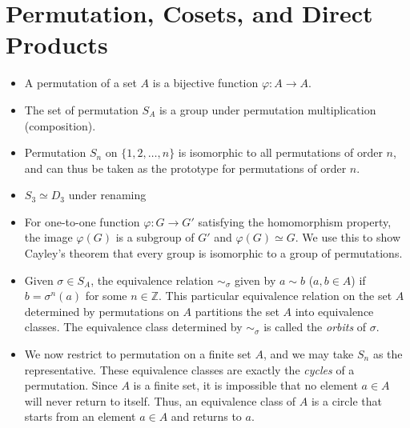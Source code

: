 \documentclass{article}
\newcommand{\Z}{\mathbb{Z}}
\renewcommand{\phi}{\varphi}
\begin{document}
\section{Permutation, Cosets, and Direct Products}
\begin{itemize}
    \item A permutation of a set $A$ is a bijective function $\phi: A \to A$.
    \item The set of permutation $S_A$ is a group under permutation multiplication (composition).
    \item Permutation $S_n$ on $\{1,2,\dots,n\}$ is isomorphic to all permutations of order $n$, and can thus be taken as the prototype for permutations of order $n$.
    \item $S_3 \simeq D_3$ under renaming
    \item For one-to-one function $\phi: G \to G'$ satisfying the homomorphism property, the image $\phi(G)$ is a subgroup of $G'$ and $\phi(G) \simeq G$. We use this to show Cayley's theorem that every group is isomorphic to a group of permutations.
    \item Given $\sigma \in S_A$, the equivalence relation $\sim_\sigma$ given by $a \sim b$ ($a,b \in A$) if $b = \sigma^n(a)$ for some $n \in \Z$. This particular equivalence relation on the set $A$ determined by permutations on $A$ partitions the set $A$ into equivalence classes. The equivalence class determined by $\sim_\sigma$ is called the \textit{orbits} of $\sigma$.
    \item We now restrict to permutation on a finite set $A$, and we may take $S_n$ as the representative. These equivalence classes are exactly the \textit{cycles} of a permutation. Since $A$ is a finite set, it is impossible that no element $a \in A$ will never return to itself. Thus, an equivalence class of $A$ is a circle that starts from an element $a \in A$ and returns to $a$.
    

\end{itemize}
\end{document}
